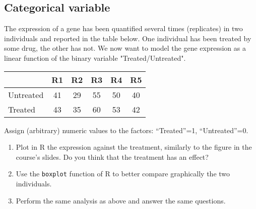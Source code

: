 \documentclass[a4paper,11pt]{article}
\begin{document}
\newpage

\subsection{Categorical variable}

The expression of a gene has been quantified several times (replicates)
in two individuals and reported in the table below. One individual has been treated by some drug, 
the other has not. We now want to model the gene expression as a linear function of the binary variable 
"Treated/Untreated".

\begin{table}[hbt]
\centering
\begin{tabular}{ l | ccccc }
                 & R1 & R2 & R3 & R4 & R5 \\
                 \hline
Untreated    & 41  & 29 & 55  & 50 & 40  \\
Treated & 43  & 35 & 60  & 53 & 42 
\end{tabular}
\end{table}

\noindent
Assign (arbitrary) numeric values to the factors: ``Treated''=1, ``Untreated''=0. 

\begin{enumerate}
\item Plot in R the expression against the treatment, similarly to the figure in the course's slides.
Do you think that the treatment has an effect?
\item Use the \texttt{boxplot} function of R to better compare graphically the two individuals.
\item Perform the same analysis as above and answer the same questions.
\end{enumerate}
\end{document}
